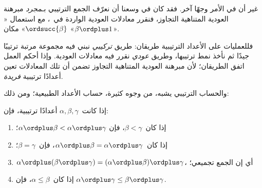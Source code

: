 \documentclass[../../../include/open-logic-section]{subfiles}
\begin{document}
غير أن في الأمر وجهًا آخر. فقد كان في وسعنا أن نعرّف الجمع الترتيبي
بـ\emph{مجرد} مبرهنة العودية المتناهية التجاوز، فنقرر معادلات
العودية الواردة في~، مع استعمال
«$\ordsucc{\beta}$» مكان «$\beta \ordplus 1$».

فللعمليات على الأعداد الترتيبية طريقان: طريق \emph{تركيبي} نبني فيه
مجموعة مرتبة ترتيبًا جيدًا ثم نأخذ نمط ترتيبها، وطريق \emph{عودي}
نقرر فيه معادلات العودية. وإذا أحكم العمل اتفق الطريقان؛ لأن مبرهنة
العودية المتناهية التجاوز تضمن أن تلك المعادلات تعين أعدادًا ترتيبية
\emph{فريدة}.

والحساب الترتيبي يشبه، من وجوه كثيرة، حساب الأعداد الطبيعية؛ ومن ذلك:

\begin{lem}
إذا كانت~$\alpha, \beta, \gamma$ أعدادًا ترتيبية، فإن:
\begin{enumerate}
	\item{} إذا كان~$\beta < \gamma$، فإن
	$\alpha \ordplus \beta < \alpha \ordplus \gamma$؛
	\item{} إذا كان~$\alpha \ordplus \beta =
	\alpha\ordplus \gamma$، فإن~$\beta = \gamma$؛
	\item{} $\alpha \ordplus (\beta \ordplus
	\gamma) = (\alpha \ordplus \beta) \ordplus \gamma$، أي إن الجمع
	تجميعي؛
	\item{} إذا كان~$\alpha \leq \beta$، فإن
	$\alpha \ordplus \gamma \leq \beta \ordplus \gamma$.
\end{enumerate}
\end{lem}
\end{document}
